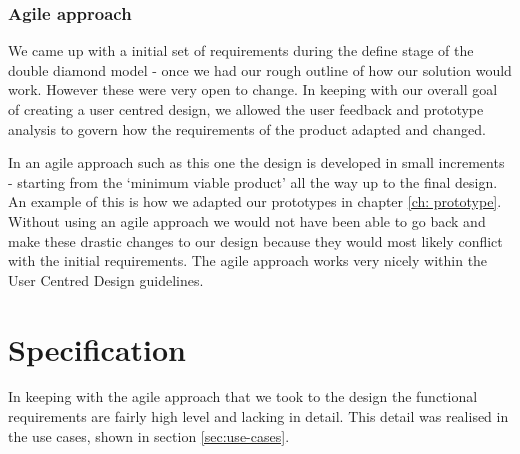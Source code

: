 \documentclass[a4paper]{report}
\begin{document}
\subsection{Agile approach}
We came up with a initial set of requirements during the define stage of the double diamond model - once we had our rough outline of how our solution would work. However these were very open to change. In keeping with our overall goal of creating a user centred design, we allowed the user feedback and prototype analysis to govern how the requirements of the product adapted and changed. 

In an agile approach such as this one the design is developed in small increments - starting from the `minimum viable product' all the way up to the final design. An example of this is how we adapted our prototypes in chapter \ref{ch: prototype}. Without using an agile approach we would not have been able to go back and make these drastic changes to our design because they would most likely conflict with the initial requirements. The agile approach works very nicely within the User Centred Design guidelines.

\chapter{Specification}
In keeping with the agile approach that we took to the design the functional requirements are fairly high level and lacking in detail. This detail was realised in the use cases, shown in section \ref{sec:use-cases}.
\end{document}
